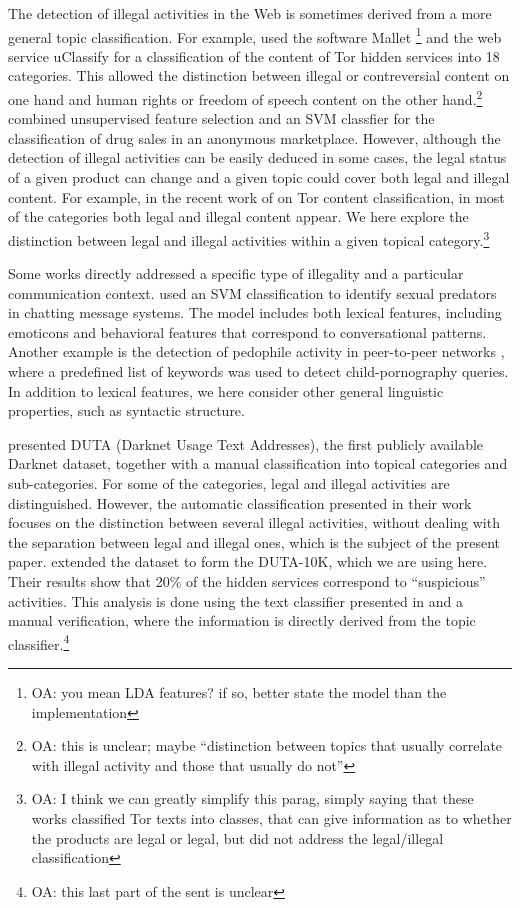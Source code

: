 \documentclass[11pt,a4paper,table]{article}
\newcommand{\oa}[1]{\footnote{\color{red}OA: #1}}
\begin{document}
The detection of illegal activities in the Web is sometimes derived from a more general topic classification. For example, \citet{Biryukov14} used the software Mallet \citep{McCallum02}\oa{you mean LDA features? if so, better state the model than the implementation} and the web service uClassify \citep{Kagstrom13} for a classification of the content of Tor hidden services into 18 categories. This allowed the distinction between illegal or contreversial content on one hand and human rights or freedom of speech content on the other hand.\oa{this is unclear; maybe ``distinction between topics that usually correlate with illegal activity and those that usually do not''} 
\citet{GraczykKinningham15} combined unsupervised feature selection and an SVM classfier for the classification of drug sales in an anonymous marketplace. However, although the detection of illegal activities can be easily deduced in some cases, the legal status of a given product can change \citep{GraczykKinningham15} and a given topic could cover both legal and illegal content. For example, in the recent work of \citet{Avarikioti18} on Tor content classification, in most of the categories both legal and illegal content appear. We here explore the distinction between legal and illegal activities within a given topical category.\oa{I think we can greatly simplify this parag, simply saying that these works classified Tor texts into classes, that can give information as to whether the products are legal or legal, but did not address the legal/illegal classification}

Some works directly addressed a specific type of illegality and a particular communication context. \citet{MorrisHirst12} used an SVM classification to identify sexual predators in chatting message systems. The model includes both lexical features, including emoticons and behavioral features that correspond to conversational patterns. Another example is the detection of pedophile activity in peer-to-peer networks \citep{Latapy13}, where a predefined list of keywords was used to detect child-pornography queries. In addition to lexical features, we here consider other general linguistic properties, such as syntactic structure.%

\citet{AlNabki17} presented DUTA (Darknet Usage Text Addresses), the first publicly available Darknet dataset, together with a manual classification into topical categories and sub-categories. For some of the categories, legal and illegal activities are distinguished. However, the automatic classification presented in their work focuses on the distinction between several illegal activities, without dealing with the separation between legal and illegal ones, which is the subject of the present paper. \citet{AlNabki19} extended the dataset to form the DUTA-10K, which we are using here. Their results show that 20\% of the hidden services correspond to ``suspicious'' activities. This analysis is done using the text classifier presented in \citet{AlNabki17} and a manual verification, where the information is directly derived from the topic classifier.\oa{this last part of the sent is unclear}
\end{document}
